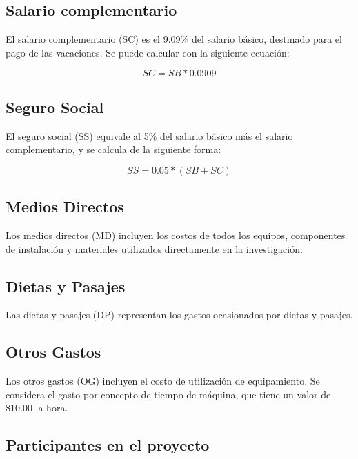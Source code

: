 \subsection{Salario complementario}

El salario complementario (SC) es el 9.09\% del salario básico, destinado para el pago de las vacaciones. Se puede calcular con la siguiente ecuación:

\begin{equation} 
\label{eq:salary_complementary}
SC = SB * 0.0909 
\end{equation}

\subsection{Seguro Social}

El seguro social (SS) equivale al 5\% del salario básico más el salario complementario, y se calcula de la siguiente forma:

\begin{equation} 
\label{eq:social_security}
SS = 0.05 * (SB + SC) 
\end{equation}

\subsection{Medios Directos}

Los medios directos (MD) incluyen los costos de todos los equipos, componentes de instalación y materiales utilizados directamente en la investigación.

\subsection{Dietas y Pasajes}

Las dietas y pasajes (DP) representan los gastos ocasionados por dietas y pasajes.

\subsection{Otros Gastos}

Los otros gastos (OG) incluyen el costo de utilización de equipamiento. Se considera el gasto por concepto de tiempo de máquina, que tiene un valor de \$10.00 la hora.

\subsection{Participantes en el proyecto}


